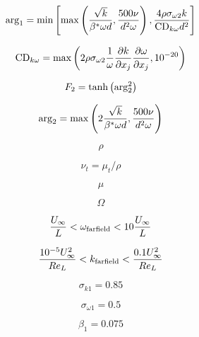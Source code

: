 \begin{equation}
{\rm arg}_1 = {\rm min} \left[ {\rm max} \left( \frac{\sqrt{k}}{\beta^*\omega d},
   \frac{500 \nu}{d^2 \omega} \right) , \frac{4 \rho \sigma_{\omega 2} k}{{\rm CD}_{k \omega} d^2} \right]
\end{equation}

\begin{equation}
{\rm CD}_{k \omega} = {\rm max} \left(2 \rho \sigma_{\omega 2} \frac{1}{\omega}
   \frac{\partial k}{\partial x_j} \frac{\partial \omega}{\partial x_j}, 10^{-20} \right)
\end{equation}

\begin{equation}
F_2 = {\rm tanh} \left({\rm arg}_2^2 \right)
\end{equation}

\begin{equation}
{\rm arg}_2 = {\rm max} \left( 2 \frac{\sqrt{k}}{\beta^* \omega d}, \frac{500 \nu}{d^2 \omega} \right)
\end{equation}

\begin{equation}
\rho
\end{equation}

\begin{equation}
\nu_t = \mu_t/\rho
\end{equation}

\begin{equation}
\mu
\end{equation}

\begin{equation}
\Omega
\end{equation}

\begin{equation}
\frac{U_{\infty}}{L} < \omega_{\rm farfield} < 10 \frac{U_{\infty}}{L}
\end{equation}

\begin{equation}
\frac{10^{-5}U_{\infty}^2}{Re_L} < k_{\rm farfield} < \frac{0.1 U_{\infty}^2}{Re_L}
\end{equation}

\begin{equation}
\sigma_{k 1} = 0.85
\end{equation}

\begin{equation}
\sigma_{\omega 1} = 0.5
\end{equation}

\begin{equation}
\beta_1 = 0.075
\end{equation}

